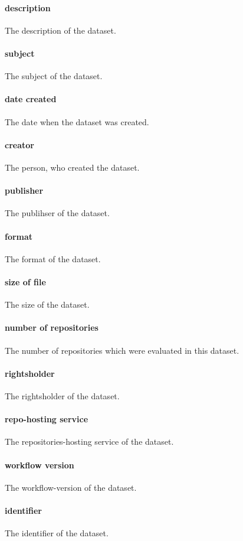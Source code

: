 \paragraph{description}
The description of the dataset.
\paragraph{subject}
The subject of the dataset.
\paragraph{date created}
The date when the dataset was created.
\paragraph{creator}
The person, who created the dataset.
\paragraph{publisher}
The publihser of the dataset.
\paragraph{format}
The format of the dataset.
\paragraph{size of file}
The size of the dataset.
\paragraph{number of repositories}
The number of repositories which were evaluated in this dataset.
\paragraph{rightsholder}
The rightsholder of the dataset.
\paragraph{repo-hosting service}
The repositories-hosting service of the dataset.
\paragraph{workflow version}
The workflow-version of the dataset.
\paragraph{identifier}
The identifier of the dataset.
